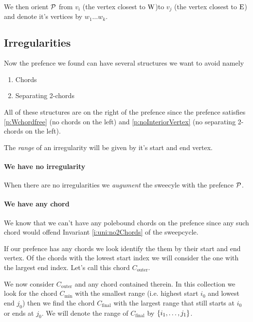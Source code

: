     We then orient $\P$ from $v_i$ (the vertex closest to $\pW$)to $v_j$ (the vertex closest to $\pE$) and denote it's vertices by $w_1 \ldots w_k$.

  \subsection{Irregularities}
    Now the prefence we found can have several structures we want to avoid
    namely
    \begin{enumerate}
      \itemsep=-4pt
      \item Chords
      \item Separating 2-chords
    \end{enumerate}

    All of these structures are on the right of the prefence since the prefence satisfies \ref{p:Wchordfree} (no chords on the left) and \ref{p:noInteriorVertex} (no separating 2-chords on the left).

    The \emph{range} of an irregularity will be given by it's start and end vertex.

    \paragraph{We have no irregularity}
      When there are no irregularities we \emph{augument} the sweecyle with the prefence $\P$.

    \paragraph{We have any chord}
    We know that we can't have any polebound chords on the prefence since any such chord would offend Invariant \ref{i:uni:no2Chords} of the sweepcycle.

    If our prefence has any chords we look identify the them by their start and end vertex. Of the chords with the lowest start index we will consider the one with the largest end index. Let's call this chord $C_\text{outer}$.

    We now consider $C_\text{outer}$ and any chord contained therein. In this collection we look for the chord $C_\text{min}$ with the smallest range (i.e. highest start $i_0$ and lowest end $j_0$) then we find the chord $C_\text{final}$ with the largest range that still starts at $i_0$ or ends at $j_0$. We will denote the range of $C_\text{final}$ by $\braces{i_1, \ldots, j_1}$.

